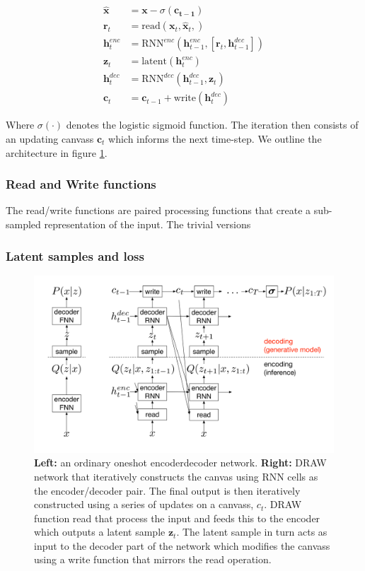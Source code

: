 \begin{align}
\hat{\mathbf{x}} &= \mathbf{x} - \sigma(\mathbf{c_{t-1}}) \\
\mathbf{r}_t &= \text{read}(\mathbf{x}_t, \hat{\mathbf{x}}_t, ) \\
\mathbf{h}^{enc}_t &= \text{RNN}^{enc}( \mathbf{h}^{enc}_{t-1}, [\mathbf{r}_t, \mathbf{h}^{dec}_{t-1}])\\
\mathbf{z}_t &= \text{latent}(\mathbf{h}^{enc}_t)\\
\mathbf{h}^{dec}_t &= \text{RNN}^{dec}( \mathbf{h}^{dec}_{t-1}, \mathbf{z}_t)\\
\mathbf{c}_t &= \mathbf{c}_{t-1} + \text{write}(\mathbf{h}_t^{dec}) \label{eq:draw}
\end{align} 

 \noindent Where $\sigma(\cdot)$ denotes the logistic sigmoid function. The iteration then consists of an updating canvass $\mathbf{c}_t$ which informs the next time-step. We outline the architecture in figure \ref{fig:draw}.
 
 \subsubsection{Read and Write functions}

 The read/write functions are paired processing functions that create a sub-sampled representation of the input. The trivial versions 


 \subsubsection{Latent samples and loss}

\begin{figure}
\centering
\includegraphics[width=\textwidth]{../figures/draw}
\caption{\textbf{Left:} an ordinary one\-shot encoder\-decoder network. \textbf{Right:} DRAW network that iteratively constructs the canvas using RNN cells as the encoder/decoder pair. The final output is then iteratively constructed using a series of updates on a canvass, $c_t$. DRAW function read that process the input and feeds this to the encoder which outputs a latent sample $\mathbf{z}_t$. The latent sample in turn acts as input to the decoder part of the network which modifies the canvass using a write function that mirrors the read operation.}\label{fig:draw}
\end{figure}
